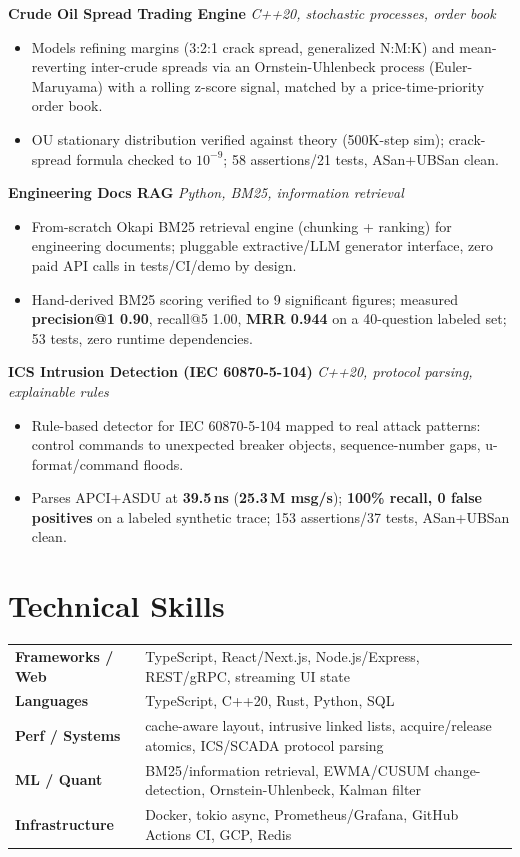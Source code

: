 \documentclass[10pt]{article}
\newcommand{\projectentry}[2]{%
  \noindent\textbf{#1} \hfill \textit{#2}\\[-0.3em]
}
\begin{document}
\projectentry{Crude Oil Spread Trading Engine}{C++20, stochastic processes, order book}
\begin{itemize}
  \item Models refining margins (3:2:1 crack spread, generalized N:M:K) and mean-reverting inter-crude spreads via an Ornstein-Uhlenbeck process (Euler-Maruyama) with a rolling z-score signal, matched by a price-time-priority order book.
  \item OU stationary distribution verified against theory (500K-step sim); crack-spread formula checked to $10^{-9}$; 58 assertions/21 tests, ASan+UBSan clean.
\end{itemize}

\projectentry{Engineering Docs RAG}{Python, BM25, information retrieval}
\begin{itemize}
  \item From-scratch Okapi BM25 retrieval engine (chunking + ranking) for engineering documents; pluggable extractive/LLM generator interface, zero paid API calls in tests/CI/demo by design.
  \item Hand-derived BM25 scoring verified to 9 significant figures; measured \textbf{precision@1 0.90}, recall@5 1.00, \textbf{MRR 0.944} on a 40-question labeled set; 53 tests, zero runtime dependencies.
\end{itemize}

\projectentry{ICS Intrusion Detection (IEC 60870-5-104)}{C++20, protocol parsing, explainable rules}
\begin{itemize}
  \item Rule-based detector for IEC 60870-5-104 mapped to real attack patterns: control commands to unexpected breaker objects, sequence-number gaps, u-format/command floods.
  \item Parses APCI+ASDU at \textbf{39.5\,ns} (\textbf{25.3\,M msg/s}); \textbf{100\% recall, 0 false positives} on a labeled synthetic trace; 153 assertions/37 tests, ASan+UBSan clean.
\end{itemize}

\section*{Technical Skills}
\noindent
\begin{tabular}{@{}p{2.7cm}p{15.5cm}@{}}
\textbf{Frameworks / Web} & TypeScript, React/Next.js, Node.js/Express, REST/gRPC, streaming UI state \\
\textbf{Languages} & TypeScript, C++20, Rust, Python, SQL \\
\textbf{Perf / Systems} & cache-aware layout, intrusive linked lists, acquire/release atomics, ICS/SCADA protocol parsing \\
\textbf{ML / Quant} & BM25/information retrieval, EWMA/CUSUM change-detection, Ornstein-Uhlenbeck, Kalman filter \\
\textbf{Infrastructure} & Docker, tokio async, Prometheus/Grafana, GitHub Actions CI, GCP, Redis \\
\end{tabular}
\end{document}

